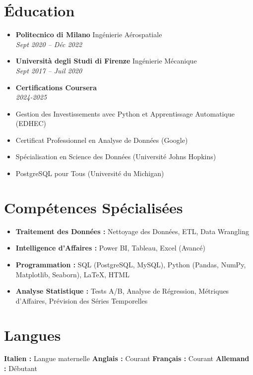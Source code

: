 \documentclass[letterpaper,10.5pt]{article}
\newcommand{\resumeEntry}[4]{
  \item\textbf{#1} \hfill #2\\
  \textit{#3} \hfill \textit{#4}
}
\begin{document}
\section*{Éducation}
\begin{itemize}[leftmargin=0.2in]
    \resumeEntry{Politecnico di Milano}{Ingénierie Aérospatiale}{Sept 2020 -- Déc 2022}{}
    \resumeEntry{Università degli Studi di Firenze}{Ingénierie Mécanique}{Sept 2017 -- Juil 2020}{}
    \resumeEntry{Certifications Coursera}{}{2024-2025}{}
\end{itemize}
\begin{multicols}{2}
    \small
    \begin{itemize}[leftmargin=0.4 in, label={-}]
        \item Gestion des Investissements avec Python et Apprentissage Automatique (EDHEC)
        \item Certificat Professionnel en Analyse de Données (Google)
    \end{itemize}
    \begin{itemize}[leftmargin=0.3 in, label={-}]
        \item Spécialisation en Science des Données (Université Johns Hopkins)
        \item PostgreSQL pour Tous (Université du Michigan)
    \end{itemize}
\end{multicols}

\section*{Compétences Spécialisées}\vspace{-15pt}
\begin{multicols}{2}
\begin{itemize}[leftmargin=0.2in]
    \item \textbf{Traitement des Données :} Nettoyage des Données, ETL, Data Wrangling
    \item \textbf{Intelligence d'Affaires :} Power BI, Tableau, Excel (Avancé)
    \item \textbf{Programmation :} SQL (PostgreSQL, MySQL), Python (Pandas, NumPy, Matplotlib, Seaborn), LaTeX, HTML
    \item \textbf{Analyse Statistique :} Tests A/B, Analyse de Régression, Métriques d'Affaires, Prévision des Séries Temporelles
\end{itemize}
\end{multicols}

\section*{Langues}\vspace{-5pt}
\textbf{Italien :} Langue maternelle \hspace{20pt} \textbf{Anglais :} Courant \hspace{20pt} \textbf{Français :} Courant \hspace{20pt} \textbf{Allemand :} Débutant
\end{document}
